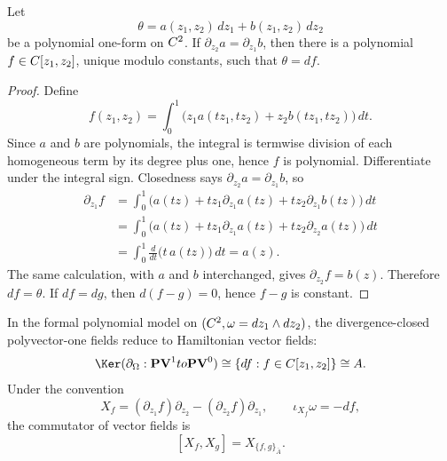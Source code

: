 \documentclass[11pt]{memoir}
\begin{document}
\begin{lem}\label{lem:polynomial-poincare}
  Let
  $$\theta=a(z_1,z_2)\,dz_1+b(z_1,z_2)\,dz_2$$
  be a polynomial one-form on $C^2$. If
  $\partial_{z_2}a=\partial_{z_1}b$, then there is a polynomial
  $f\in C[z_1,z_2]$, unique modulo constants, such that $\theta=df$.
\end{lem}

\begin{proof}
  Define
  $$f(z_1,z_2)=\int_0^1
    \bigl(z_1a(tz_1,tz_2)+z_2b(tz_1,tz_2)\bigr)\,dt.$$
  Since $a$ and $b$ are polynomials, the integral is termwise division of each
  homogeneous term by its degree plus one, hence $f$ is polynomial. Differentiate
  under the integral sign. Closedness says
  $\partial_{z_2}a=\partial_{z_1}b$, so
  \begin{align*}
  \partial_{z_1}f
    &=\int_0^1\bigl(a(tz)+tz_1\partial_{z_1}a(tz)
       +tz_2\partial_{z_1}b(tz)\bigr)\,dt\\
    &=\int_0^1\bigl(a(tz)+t z_1\partial_{z_1}a(tz)
       +t z_2\partial_{z_2}a(tz)\bigr)\,dt\\
    &=\int_0^1\frac{d}{dt}\bigl(t\,a(tz)\bigr)\,dt
      =a(z).
  \end{align*}
  The same calculation, with $a$ and $b$ interchanged, gives
  $\partial_{z_2}f=b(z)$. Therefore $df=\theta$.
  If $df=dg$, then $d(f-g)=0$, hence $f-g$ is constant.
\end{proof}

\begin{prop}\label{prop:hamiltonian-polyvector-reduction}
  In the formal polynomial model on $(C^2,\omega=dz_1\wedge dz_2)$, the
  divergence-closed polyvector-one fields reduce to Hamiltonian vector fields:
  $$\Ker(\partial_{\Omega}:\mathbf{PV}^{1}\to\mathbf{PV}^{0})
    \cong \{df:f\in\C[z_1,z_2]\}
    \cong \bar A.$$
  Under the convention
  $$X_f=(\partial_{z_1}f)\partial_{z_2}
    -(\partial_{z_2}f)\partial_{z_1},\qquad \iota_{X_f}\omega=-df,$$
  the commutator of vector fields is
  $$[X_f,X_g]=X_{\{f,g\}_{\bar A}}.$$
\end{prop}
\end{document}
